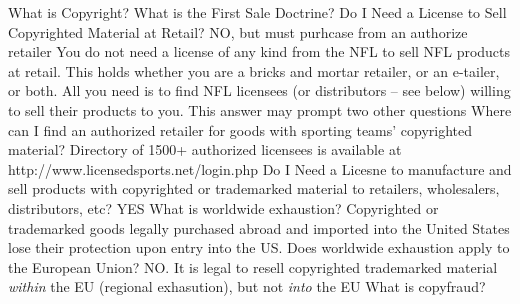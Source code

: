 \documentclass[letterpaper,11pt]{texMemo}
\begin{document}
What is Copyright?
What is the First Sale Doctrine?
Do I Need a License to Sell Copyrighted Material at Retail?
	NO, but must purhcase from an authorize retailer
		You do not need a license of any kind from the NFL to sell NFL products at retail. This holds whether you are a bricks and mortar retailer, or an e-tailer, or both. All you need is to find NFL licensees (or distributors – see below) willing to sell their products to you. This answer may prompt two other questions
Where can I find an authorized retailer for goods with sporting teams' copyrighted material?
	Directory of 1500+ authorized licensees is available at http://www.licensedsports.net/login.php
Do I Need a Licesne to manufacture and sell products with copyrighted or trademarked material to retailers, wholesalers, distributors, etc?
	YES
What is worldwide exhaustion?
	Copyrighted or trademarked goods legally purchased abroad and imported into the United States lose their protection upon entry into the US.
Does worldwide exhaustion apply to the European Union?
	NO. It is legal to resell copyrighted trademarked material \emph{within} the EU (regional exhasution), but not \emph{into} the EU
What is copyfraud?
\end{document}
